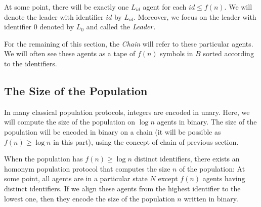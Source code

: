 \documentclass[UKenglish]{llncs}
\newcommand\motnouv[1]{{\emph{#1}}}
\begin{document}
At some point, there will be exactly one $L_{id}$ agent for each $id\le f(n)$.
We will denote the leader with identifier ${id}$ by $L_{id}$. Moreover, 
we focus on the leader with identifier $0$ denoted by  $L_0$ and called the $\motnouv{Leader}$.

For the remaining of this section, the \motnouv{Chain} will refer to these particular agents.
We will often see these agents as a tape of $f(n)$ symbols in $B$
sorted according to the identifiers.



\subsection{The Size of the Population}

In many classical population protocols, integers are encoded in unary.
Here, we will compute the size of the population on $\log n$ agents in binary.
The size of the population will be encoded in binary on a chain
(it will be possible as $f(n)\ge\log n$ in this part), using the
concept of chain of previous section. 




\begin{proposition}\label{compte}
When the population has $f(n)\ge\log n$ distinct identifiers,
there exists an homonym population protocol that computes the size $n$
of the population: 
At some point,  all agents are in a particular state $N$ except   $f(n)$ agents having distinct identifiers.
If we align these agents from the highest identifier
to the lowest one,  then they encode the size of the population $n$ written  in binary.
\end{proposition}
\end{document}
